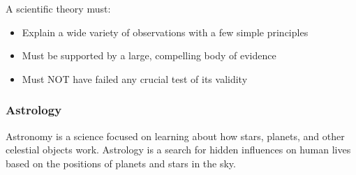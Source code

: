 A scientific theory must:
\begin{itemize}
\item Explain a wide variety of observations with a few simple principles
\item Must be supported by a large, compelling body of evidence
\item Must NOT have failed any crucial test of its validity
\end{itemize}

\subsubsection{Astrology}
Astronomy is a science focused on learning about how stars, planets, and other celestial  objects work. Astrology is a search for hidden influences on  human lives based on the positions of planets  and stars in the sky.
